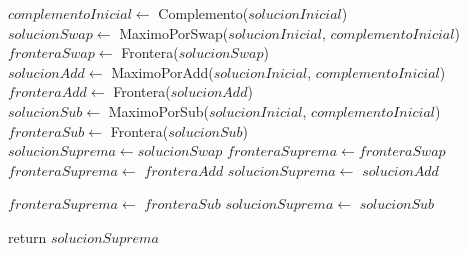 \begin{algorithm}[H]
\begin{algorithmic}
    \State $complementoInicial \gets$ Complemento($solucionInicial$) \\

    \State $solucionSwap \gets$ MaximoPorSwap($solucionInicial$, $complementoInicial$)
    \State $fronteraSwap \gets$ Frontera($solucionSwap$) \\

    \State $solucionAdd \gets$ MaximoPorAdd($solucionInicial$, $complementoInicial$)
    \State $fronteraAdd \gets$ Frontera($solucionAdd$) \\

    \State $solucionSub \gets$ MaximoPorSub($solucionInicial$, $complementoInicial$)
    \State $fronteraSub \gets$ Frontera($solucionSub$) \\

    \State $solucionSuprema \gets solucionSwap$
    \State $fronteraSuprema \gets fronteraSwap$ \\

        \State $fronteraSuprema \gets$ $fronteraAdd$
        \State $solucionSuprema \gets$ $solucionAdd$  \\
    \EndIf

        \State $fronteraSuprema \gets$ $fronteraSub$
        \State $solucionSuprema \gets$ $solucionSub$ \\
    \EndIf

    \State return $solucionSuprema$
\EndFunction

\end{algorithmic}
\end{algorithm}


